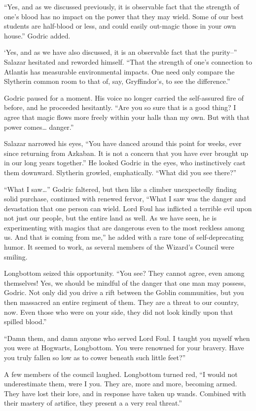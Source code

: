 “Yes, and as we discussed previously, it is observable fact that the strength of one’s blood has no impact on the power that they may wield. Some of our best students are half-blood or less, and could easily out-magic those in your own house.” Godric added.

‘Yes, and as we have also discussed, it is an observable fact that the purity–” Salazar hesitated and reworded himself. “That the strength of one’s connection to Atlantis has measurable environmental impacts. One need only compare the Slytherin common room to that of, say, Gryffindor’s, to see the difference.”

Godric paused for a moment. His voice no longer carried the self-assured fire of before, and he proceeded hesitantly. “Are you so sure that is a good thing? I agree that magic flows more freely within your halls than my own. But with that power comes… danger.”

Salazar narrowed his eyes, “You have danced around this point for weeks, ever since returning from Azkaban. It is not a concern that you have ever brought up in our long years together.” He looked Godric in the eyes, who instinctively cast them downward. Slytherin growled, emphatically. “What did you see there?”

“What I saw…” Godric faltered, but then like a climber unexpectedly finding solid purchase, continued with renewed fervor, “What I saw was the danger and devastation that one person can wield. Lord Foul has inflicted a terrible evil upon not just our people, but the entire land as well. As we have seen, he is experimenting with magics that are dangerous even to the most reckless among us. And that is coming from me,” he added with a rare tone of self-deprecating humor. It seemed to work, as several members of the Wizard’s Council were smiling.

Longbottom seized this opportunity. “You see? They cannot agree, even among themselves! Yes, we should be mindful of the danger that one man may possess, Godric. Not only did you drive a rift between the Goblin communities, but you then massacred an entire regiment of them. They are a threat to our country, now. Even those who were on your side, they did not look kindly upon that spilled blood.”

“Damn them, and damn anyone who served Lord Foul. I taught you myself when you were at Hogwarts, Longbottom. You were renowned for your bravery. Have you truly fallen so low as to cower beneath such little feet?”

A few members of the council laughed. Longbottom turned red, “I would not underestimate them, were I you. They are, more and more, becoming armed. They have lost their lore, and in response have taken up wands. Combined with their mastery of artifice, they present a a very real threat.”

